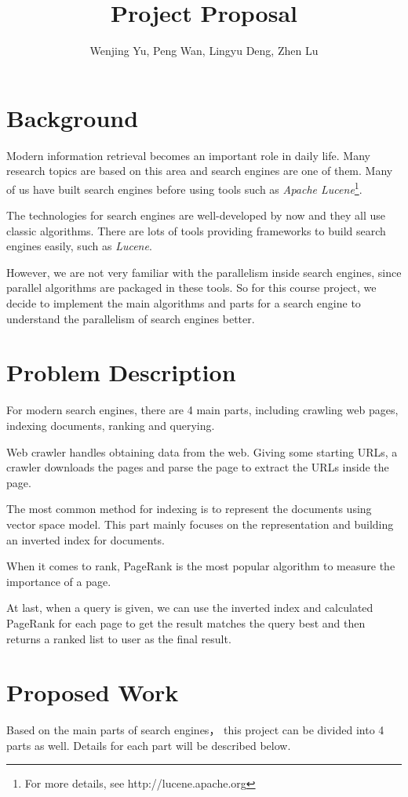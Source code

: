 \documentclass[11pt]{amsart}
\title{Project Proposal}
\author{Wenjing Yu, Peng Wan, Lingyu Deng, Zhen Lu}
\begin{document}
\maketitle
\section{Background}
Modern information retrieval becomes an important role in daily life. Many research topics
are based on this area and search engines are one of them. Many of us have built search engines 
before using tools such as \emph{Apache Lucene}\footnote{For more details, see 
http://lucene.apache.org}. 

The technologies for search engines are well-developed by now and they all use classic algorithms.
There are lots of tools providing frameworks to build search engines easily, such as \emph{Lucene}.

However, we are not very familiar with the parallelism inside search engines, since parallel algorithms
are packaged in these tools. So for this course project, we decide to implement the main algorithms 
and parts for a search engine to understand the parallelism of search engines better.

\section{Problem Description}
For modern search engines, there are 4 main parts, including crawling web pages, indexing documents, 
ranking and querying. 

Web crawler handles obtaining data from the web. Giving some starting URLs, a crawler downloads the
pages and parse the page to extract the URLs inside the page. 

The most common method for indexing is to represent the documents using vector space model. This part
mainly focuses on the representation and building an inverted index for documents.

When it comes to rank, PageRank is the most popular algorithm to measure the importance of a page. 

At last, when a query is given, we can use the inverted index and calculated PageRank for each page
to get the result matches the query best and then returns a ranked list to user as the final result.

\section{Proposed Work}
Based on the main parts of search engines， this project can be divided into 4 parts as well. Details
for each part will be described below.
\end{document}

